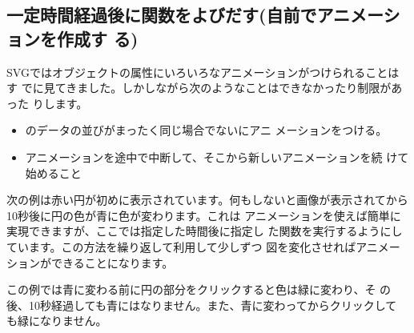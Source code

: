 \subsection{一定時間経過後に関数をよびだす(自前でアニメーションを作成す
る)}
SVGではオブジェクトの属性にいろいろなアニメーションがつけられることはす
でに見てきました。しかしながら次のようなことはできなかったり制限があった
りします。
\begin{itemize}
 \item {}のデータの並びがまったく同じ場合でないにアニ
       メーションをつける。
 \item アニメーションを途中で中断して、そこから新しいアニメーションを続
       けて始めること
\end{itemize}

次の例は赤い円が初めに表示されています。何もしないと画像が表示されてから
10秒後に円の色が青に色が変わります。これは
アニメーションを使えば簡単に実現できますが、ここでは指定した時間後に指定し
た関数を実行するようにしています。この方法を繰り返して利用して少しずつ
図を変化させればアニメーションができることになります。

この例では青に変わる前に円の部分をクリックすると色は緑に変わり、そ
の後、10秒経過しても青にはなりません。また、青に変わってからクリックして
も緑になりません。

